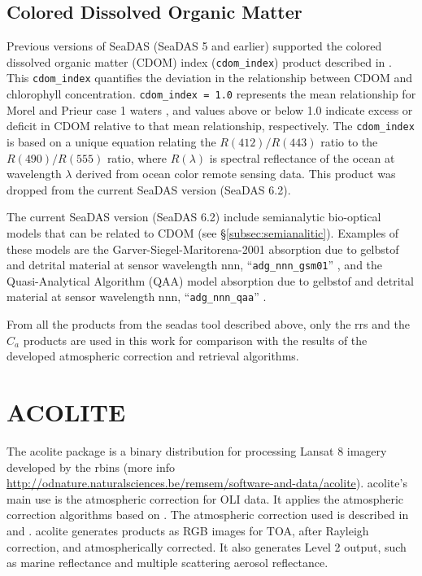 \subsection{Colored Dissolved Organic Matter}

Previous versions of SeaDAS (SeaDAS 5 and earlier) supported the colored dissolved organic matter (CDOM) index ({\tt cdom\_index}) product described in \citet{Morel2009_CDOM_index}. This {\tt cdom\_index} quantifies the deviation in the relationship between CDOM and chlorophyll concentration. {\tt cdom\_index = 1.0} represents the mean relationship for Morel and Prieur case 1 waters \citep{Morel:1977rw}, and values above or below 1.0 indicate excess or deficit in CDOM relative to that mean relationship, respectively. The {\tt cdom\_index} is based on a unique equation relating the $R(412)/R(443)$ ratio to the $R(490)/R(555)$ ratio, where $R(\lambda)$ is spectral reflectance of the ocean at wavelength $\lambda$ derived from ocean color remote sensing data. This product was dropped from the current SeaDAS version (SeaDAS 6.2).

The current SeaDAS version (SeaDAS 6.2) include semianalytic bio-optical models that can be related to CDOM (see \S\ref{subsec:semianalitic}). Examples of these models are the Garver-Siegel-Maritorena-2001 absorption due to gelbstof and detrital material at sensor wavelength nnn, ``{\tt adg\_nnn\_gsm01}'' \citep{Maritorena:02}, and the Quasi-Analytical Algorithm (QAA) model absorption due to gelbstof and detrital material at sensor wavelength nnn, ``{\tt adg\_nnn\_qaa}'' \citep{Lee_Du_Arnone2005}.

From all the products from the \gls{seadas} tool described above, only the \gls{rrs} and the $C_a$ products are used in this work for comparison with the results of the developed atmospheric correction and retrieval algorithms.
\section{ACOLITE}
\label{subsec:acolite}

The \gls{acolite} package is a binary distribution for processing Lansat 8 imagery developed by the \gls{rbins} (more info \url{http://odnature.naturalsciences.be/remsem/software-and-data/acolite}). \gls{acolite}'s main use is the atmospheric correction for OLI data. It applies the atmospheric correction algorithms based on \citet{Gordon:1994}. The atmospheric correction used is described in \citet{Vanhellemont2014} and \citet{Vanhellemont:2015}. \gls{acolite} generates products as RGB images for TOA, after Rayleigh correction, and atmospherically corrected. It also generates Level 2 output, such as marine reflectance and multiple scattering aerosol reflectance.

